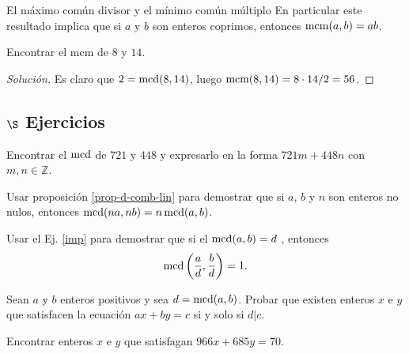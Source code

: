\begin{section}{El máximo común divisor y el mínimo común múltiplo}
En particular este resultado implica que si $a$ y $b$ son enteros coprimos, entonces $\operatorname{mcm}(a,b)=ab$.


\begin{ejemplo*} Encontrar el  mcm de $8$ y $14$.
    \begin{proof}[Solución] 
        Es claro que $2 = \operatorname{mcd}(8,14)$, luego $\operatorname{mcm}(8,14) = 8 \cdot 14 / 2 = 56$. 
    \end{proof}
\end{ejemplo*}


\subsection*{$\S$ Ejercicios}

\begin{enumex}
\item Encontrar el $\operatorname{mcd}$ de $721$ y $448$ y expresarlo en la forma
$721m+448n$ con $m,n \in \mathbb Z$.
\item\label{imp} Usar  proposición \ref{prop-d-comb-lin} para demostrar que si $a$, $b$ y $n$ son enteros no nulos, entonces
$\operatorname{mcd}(na,nb)=n\operatorname{mcd}(a,b)$.
\item Usar el  Ej. \ref{imp} para demostrar que si el
$\operatorname{mcd}(a,b)=d$ , entonces
$$
\operatorname{mcd}\left(\frac{a}{d},\frac{b}{d}\right) =1.
$$
\item  Sean $a$ y $b$ enteros positivos y sea $d=\operatorname{mcd}(a,b)$. Probar que existen
enteros $ x$ e $y$ que satisfacen la ecuación $ax+by=c$ si y solo
si $d|c$.
\item  Encontrar enteros $x$ e $y$ que satisfagan $966x+685y=70.$
\end{enumex}

\end{section}


